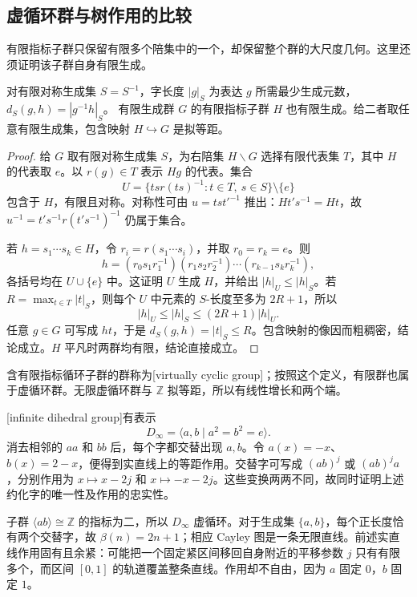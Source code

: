 \subsection{虚循环群与树作用的比较}
\label{g3:subsec:D02:05}

有限指标子群只保留有限多个陪集中的一个，却保留整个群的大尺度几何。这里还须证明该子群自身有限生成。

\begin{proposition}\label{g3:prop:D-finite-index-quasi-isometry}
	对有限对称生成集 \(S=S^{-1}\)，字长度 \(|g|_S\) 为表达 \(g\) 所需最少生成元数，\(d_S(g,h)=|g^{-1}h|_S\)。
	有限生成群 \(G\) 的有限指标子群 \(H\) 也有限生成。给二者取任意有限生成集，包含映射 \(H\hookrightarrow G\) 是拟等距。
\end{proposition}
\begin{proof}
	给 \(G\) 取有限对称生成集 \(S\)，为右陪集 \(H\backslash G\) 选择有限代表集 \(T\)，其中 \(H\) 的代表取 \(e\)。以 \(r(g)\in T\) 表示 \(Hg\) 的代表。集合
	\[
		U=\{tsr(ts)^{-1}:t\in T,\ s\in S\}\setminus\{e\}
	\]
	包含于 \(H\)，有限且对称。对称性可由 \(u=ts t'^{-1}\) 推出：\(Ht's^{-1}=Ht\)，故 \(u^{-1}=t's^{-1}r(t's^{-1})^{-1}\) 仍属于集合。

	若 \(h=s_1\cdots s_k\in H\)，令 \(r_i=r(s_1\cdots s_i)\)，并取 \(r_0=r_k=e\)。则
	\[
		h=(r_0s_1r_1^{-1})(r_1s_2r_2^{-1})\cdots(r_{k-1}s_kr_k^{-1}),
	\]
	各括号均在 \(U\cup\{e\}\) 中。这证明 \(U\) 生成 \(H\)，并给出 \(|h|_U\le|h|_S\)。若 \(R=\max_{t\in T}|t|_S\)，则每个 \(U\) 中元素的 \(S\)-长度至多为 \(2R+1\)，所以
	\[
		|h|_U\le |h|_S\le(2R+1)|h|_U.
	\]
	任意 \(g\in G\) 可写成 \(ht\)，于是 \(d_S(g,h)=|t|_S\le R\)。包含映射的像因而粗稠密，结论成立。\(H\) 平凡时两群均有限，结论直接成立。
\end{proof}

含有限指标循环子群的群称为[virtually cyclic group]；按照这个定义，有限群也属于虚循环群。无限虚循环群与 \(\mathbb Z\) 拟等距，所以有线性增长和两个端。

\begin{example}\label{g3:exm:D-infinite-dihedral}
	[infinite dihedral group]有表示
	\[
		D_\infty=\langle a,b\mid a^2=b^2=e\rangle.
	\]
	消去相邻的 \(aa\) 和 \(bb\) 后，每个字都交替出现 \(a,b\)。令 \(a(x)=-x\)、\(b(x)=2-x\)，便得到实直线上的等距作用。交替字可写成 \((ab)^j\) 或 \((ab)^ja\)，分别作用为 \(x\mapsto x-2j\) 和 \(x\mapsto-x-2j\)。这些变换两两不同，故同时证明上述约化字的唯一性及作用的忠实性。

	子群 \(\langle ab\rangle\cong\mathbb Z\) 的指标为二，所以 \(D_\infty\) 虚循环。对于生成集 \(\{a,b\}\)，每个正长度恰有两个交替字，故 \(\beta(n)=2n+1\)；相应 Cayley 图是一条无限直线。前述实直线作用固有且余紧：可能把一个固定紧区间移回自身附近的平移参数 \(j\) 只有有限多个，而区间 \([0,1]\) 的轨道覆盖整条直线。作用却不自由，因为 \(a\) 固定 \(0\)，\(b\) 固定 \(1\)。
\end{example}

